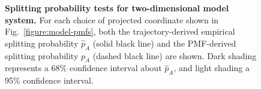 \documentclass[aps,prl,twocolumn,superscriptaddress,floatfix]{revtex4-1}
\begin{document}
\begin{figure}[tb]
\caption{\label{figure:model-splitting-comparison} {\bf Splitting probability tests for two-dimensional model system.}
For each choice of projected coordinate shown in Fig.~\ref{figure:model-pmfs}, both the trajectory-derived empirical splitting probability $\hat{p}_A$ (solid black line) and the PMF-derived splitting probability $p_A$ (dashed black line) are shown.
Dark shading represents a 68\% confidence interval about $\hat{p}_A$, and light shading a 95\% confidence interval.
}
\end{figure}
\end{document}

